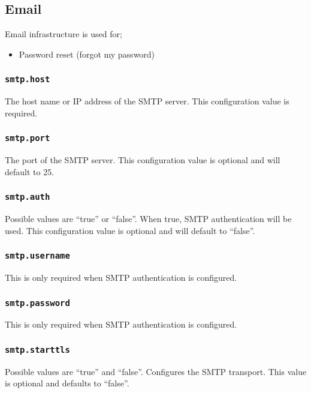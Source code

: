 \subsection{Email}

Email infrastructure is used for;

\begin{itemize}
\item Password reset (forgot my password)
\end{itemize}

\subsubsection{\tt smtp.host}

The host name or IP address of the SMTP server.  This configuration value is required.

\subsubsection{\tt smtp.port}

The port of the SMTP server.  This configuration value is optional and will default to 25.

\subsubsection{\tt smtp.auth}

Possible values are ``true'' or ``false''.  When true, SMTP authentication will be used.  This configuration value is optional and will default to ``false''.

\subsubsection{\tt smtp.username}

This is only required when SMTP authentication is configured.

\subsubsection{\tt smtp.password}

This is only required when SMTP authentication is configured.

\subsubsection{\tt smtp.starttls}

Possible values are ``true'' and ``false''.  Configures the SMTP transport.  This value is optional and defaults to ``false''.

